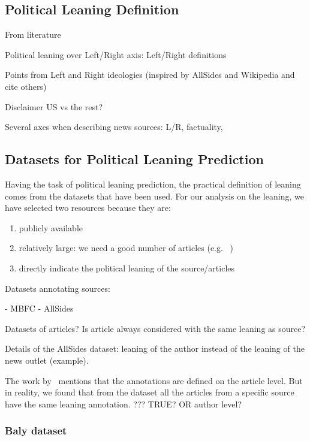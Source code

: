\subsection{Political Leaning Definition}
\label{ssec:ps_leaning_def}

From literature

Political leaning over Left/Right axis: Left/Right definitions

Points from Left and Right ideologies (inspired by AllSides and Wikipedia and cite others) 

Disclaimer US vs the rest?

Several axes when describing news sources: L/R, factuality, 

\subsection{Datasets for Political Leaning Prediction}
\label{ssec:ps_leaning_data}

Having the task of political leaning prediction, the practical definition of leaning comes from the datasets that have been used.
For our analysis on the leaning, we have selected two resources because they are:
\begin{enumerate}
    \item publicly available
    \item relatively large: we need a good number of articles (e.g. ~) 
    \item directly indicate the political leaning of the source/articles
\end{enumerate}

Datasets annotating sources:

- MBFC
- AllSides

Datasets of articles? Is article always considered with the same leaning as source?

Details of the AllSides dataset: leaning of the author instead of the leaning of the news outlet (example).

The work by~\cite{baly2020we} mentions that the annotations are defined on the article level. But in reality, we found that from the dataset all the articles from a specific source have the same leaning annotation. ??? TRUE? OR author level?

\subsubsection{Baly dataset}


